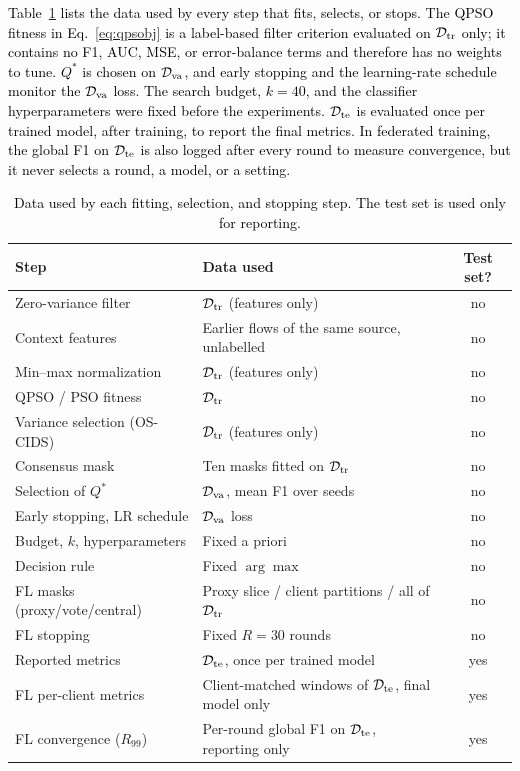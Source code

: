 \documentclass[conference]{IEEEtran}
\begin{document}
\textcolor{black}{Table~\ref{tab:data_usage} lists the data
used by every step that fits, selects, or stops. The
QPSO fitness in Eq.~\eqref{eq:qpsobj} is a label-based filter criterion
evaluated on $\mathcal{D}_{\rm tr}$ only; it contains no F1, AUC,
MSE, or error-balance terms and therefore has no weights to tune.
$Q^{*}$ is chosen on $\mathcal{D}_{\rm va}$, and early stopping and
the learning-rate schedule monitor the $\mathcal{D}_{\rm va}$ loss.
The search budget, $k=40$, and the classifier hyperparameters were
fixed before the experiments. $\mathcal{D}_{\rm te}$ is evaluated
once per trained model, after training, to report the final
metrics. In federated training, the global F1 on $\mathcal{D}_{\rm te}$
is also logged after every round to measure convergence, but it never
selects a round, a model, or a setting.}

\begin{table}[!t]
\centering
\scriptsize
\caption{\textcolor{black}{Data used by each fitting,
selection, and stopping step. The test set is used only for
reporting.}}
\label{tab:data_usage}
\setlength{\tabcolsep}{3pt}
\renewcommand{\arraystretch}{1.05}
\begin{tabular}{p{2.6cm} p{3.6cm} c}
\hline\toprule
\textbf{Step} & \textbf{Data used} & \textbf{Test set?} \\
\hline\toprule
Zero-variance filter & $\mathcal{D}_{\rm tr}$ (features only) & no \\
Context features & Earlier flows of the same source, unlabelled & no \\
Min--max normalization & $\mathcal{D}_{\rm tr}$ (features only) & no \\
QPSO / PSO fitness & $\mathcal{D}_{\rm tr}$ & no \\
Variance selection (OS-CIDS) & $\mathcal{D}_{\rm tr}$ (features only) & no \\
Consensus mask & Ten masks fitted on $\mathcal{D}_{\rm tr}$ & no \\
Selection of $Q^{*}$ & $\mathcal{D}_{\rm va}$, mean F1 over seeds & no \\
Early stopping, LR schedule & $\mathcal{D}_{\rm va}$ loss & no \\
Budget, $k$, hyperparameters & Fixed a priori & no \\
Decision rule & Fixed $\arg\max$ & no \\
FL masks (proxy/vote/central) & Proxy slice / client partitions / all of $\mathcal{D}_{\rm tr}$ & no \\
FL stopping & Fixed $R=30$ rounds & no \\
\midrule
Reported metrics & $\mathcal{D}_{\rm te}$, once per trained model & yes \\
FL per-client metrics & Client-matched windows of $\mathcal{D}_{\rm te}$, final model only & yes \\
FL convergence ($R_{99}$) & Per-round global F1 on $\mathcal{D}_{\rm te}$, reporting only & yes \\
\hline\toprule
\end{tabular}
\end{table}
\end{document}
